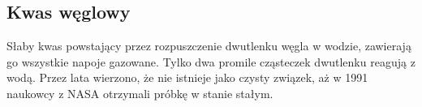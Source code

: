 \subsection{Kwas węglowy }
Słaby kwas powstający przez rozpuszczenie dwutlenku węgla w wodzie, zawierają go wszystkie napoje gazowane.
Tylko dwa promile cząsteczek dwutlenku reagują z wodą.
Przez lata wierzono, że nie istnieje jako czysty związek, aż w 1991 naukowcy z NASA otrzymali próbkę w stanie stałym.
